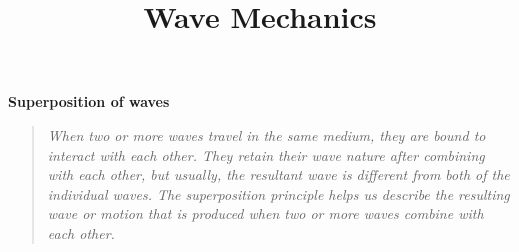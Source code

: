\documentclass[11pt]{article}
\title{Wave Mechanics}
\begin{document}
\maketitle



\begin{itemize}
    

    \pagebreak
        
    \pagebreak

    

    
    
    \pagebreak
\end{itemize}
\pagebreak
\begin{center}
    \textbf{Superposition of waves}
    \begin{quote}
        \textit{When two or more waves travel in the same medium, they are bound to interact with each other. They retain their wave nature after combining with each other, but usually, the resultant wave is different from both of the individual waves. The superposition principle helps us describe the resulting wave or motion that is produced when two or more waves combine with each other. }
    \end{quote}
\end{center}
\end{document}
